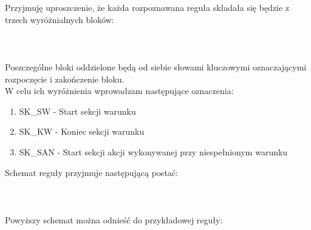 


Przyjmuję uproszczenie, że każda rozpoznawana reguła składała się będzie z trzech wyróżnialnych bloków:
\\ \\
\\ \\

Poszczególne bloki oddzielone będą od siebie słowami kluczowymi oznaczającymi rozpoczęcie i zakończenie bloku. \\

W celu ich wyróżnienia wprowadzam następujące oznaczenia:
\begin{enumerate}
	\item SK\_SW - Start sekcji warunku
	\item SK\_KW - Koniec sekcji warunku
	\item SK\_SAN - Start sekcji akcji wykonywanej przy niespełnionym warunku
\end{enumerate}
Schemat reguły przyjmuje następującą postać:
\\ \\
\\ \\

Powyższy schemat można odnieść do przykładowej reguły:
\\ \\
\\ \\
